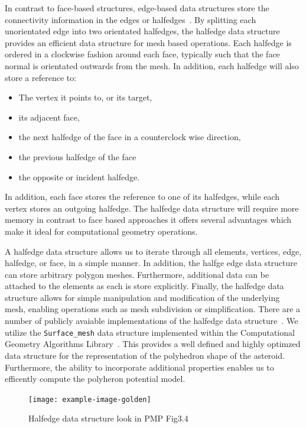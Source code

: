 In contrast to face-based structures, edge-based data structures store the connectivity information in the edges or halfedges~\cite{botsch2010,orourke1998}.
By splitting each unorientated edge into two orientated halfedges, the halfedge data structure provides an efficient data structure for mesh based operations.
Each halfedge is ordered in a clockwise fashion around each face, typically such that the face normal is orientated outwards from the mesh.
In addition, each halfedge will also store a reference to:
\begin{itemize}
    \item The vertex it points to, or its target,
    \item its adjacent face,
    \item the next halfedge of the face in a counterclock wise direction,
    \item the previous halfedge of the face
    \item the opposite or incident halfedge.
\end{itemize}
In addition, each face stores the reference to one of its halfedges, while each vertex stores an outgoing halfedge. 
The halfedge data structure will require more memory in contrast to face based approaches it offers several advantages which make it ideal for computational geometry operations.

A halfedge data structure allows us to iterate through all elements, vertices, edge, halfedge, or face, in a simple manner.
In addition, the halfge edge data structure can store arbitrary polygon meshes.
Furthermore, additional data can be attached to the elements as each is store explicitly.
Finally, the halfedge data structure allows for simple manipulation and modification of the underlying mesh, enabling operations such as mesh subdivision or simplification.
There are a number of publicly avaiable implementations of the halfedge data structure~\cite{cgalproject2018,botsch2002}.
We utilize the \texttt{Surface\_mesh} data structure implemented within the Computational Geometry Algorithms Library~\cite{sieger2011}.
This provides a well defined and highly optimzed data structure for the representation of the polyhedron shape of the asteroid.
Furthermore, the ability to incorporate additional properties enables us to efficently compute the polyheron potential model.
\begin{figure}
    \centering
    \texttt{[image: example-image-golden]}
    \caption{Halfedge data structure look in PMP Fig3.4~\label{fig:halfedge_data_structure}}
\end{figure}

